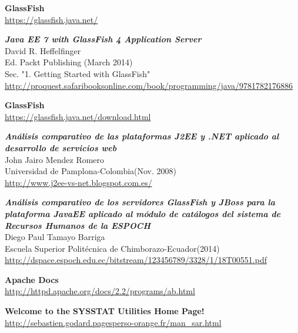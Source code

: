 \documentclass[a4paper, 10pt]{article}
\begin{document}
\begin{thebibliography}{10}
	\textbf{GlassFish}\\
		\url{https://glassfish.java.net/}

	\textbf{\textit{Java EE 7 with GlassFish 4 Application Server}}\\
	David R. Heffelfinger\\
	Ed. Packt Publishing (March 2014)\\
	Sec. "1. Getting Started with GlassFish"\\
		\url{http://proquest.safaribooksonline.com/book/programming/java/9781782176886}
		
	\textbf{GlassFish}\\
		\url{https://glassfish.java.net/download.html}
	
	\textbf{\textit{Análisis comparativo de las plataformas J2EE y .NET aplicado
	al desarrollo de servicios web}}\\
	John Jairo Mendez Romero\\
	Universidad de Pamplona-Colombia(Nov. 2008)\\
		\url{http://www.j2ee-vs-net.blogspot.com.es/}
	
	\textbf{\textit{Análisis comparativo de los servidores GlassFish y JBoss para
	la plataforma JavaEE aplicado al módulo de catálogos del sistema de Recursos
	Humanos de la ESPOCH}}\\
	Diego Paul Tamayo Barriga\\
	Escuela Superior Politécnica de Chimborazo-Ecuador(2014)\\
		\url{http://dspace.espoch.edu.ec/bitstream/123456789/3328/1/18T00551.pdf}

	\textbf{Apache Docs}\\
		\url{http://httpd.apache.org/docs/2.2/programs/ab.html}
	
	
	\textbf{Welcome to the SYSSTAT Utilities Home Page!}\\
		\url{http://sebastien.godard.pagesperso-orange.fr/man_sar.html}
\end{thebibliography}
\end{document}
